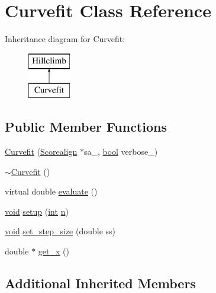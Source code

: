 \hypertarget{class_curvefit}{}\section{Curvefit Class Reference}
\label{class_curvefit}
Inheritance diagram for Curvefit\+:\begin{figure}[H]
\begin{center}
\leavevmode
\includegraphics[height=2.000000cm]{class_curvefit}
\end{center}
\end{figure}
\subsection*{Public Member Functions}
\begin{DoxyCompactItemize}
\item 
\hyperlink{class_curvefit_aa7f898ca09bc25e752ea412bf7f0ed30}{Curvefit} (\hyperlink{class_scorealign}{Scorealign} $\ast$sa\+\_\+, \hyperlink{mac_2config_2i386_2lib-src_2libsoxr_2soxr-config_8h_abb452686968e48b67397da5f97445f5b}{bool} verbose\+\_\+)
\item 
\hyperlink{class_curvefit_a1d8cc729c961dffa403b6bed8a10b66a}{$\sim$\+Curvefit} ()
\item 
virtual double \hyperlink{class_curvefit_ae942d111aa46344917edcae4d21e856d}{evaluate} ()
\item 
\hyperlink{sound_8c_ae35f5844602719cf66324f4de2a658b3}{void} \hyperlink{class_curvefit_a8bb7d7981ba055c0ab43f8c533358869}{setup} (\hyperlink{xmltok_8h_a5a0d4a5641ce434f1d23533f2b2e6653}{int} \hyperlink{class_hillclimb_a416b75fa8b2d11b4617e3bd92c2c875d}{n})
\item 
\hyperlink{sound_8c_ae35f5844602719cf66324f4de2a658b3}{void} \hyperlink{class_curvefit_aff809049090423bd5798ea50e87d4df4}{set\+\_\+step\+\_\+size} (double ss)
\item 
double $\ast$ \hyperlink{class_curvefit_aa9e3ac84698c6a669e55eca6ff4cbde2}{get\+\_\+x} ()
\end{DoxyCompactItemize}
\subsection*{Additional Inherited Members}


